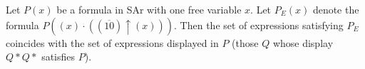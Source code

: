 Let $P(x)$ be a formula in SAr with one free variable $x$. Let $P_E(x)$ denote the formula $P((x) \cdot ((\overline{10}) \uparrow (x)))$. Then the set of expressions satisfying $P_E$ coincides with the set of expressions displayed in $P$ (those $Q$ whose display $Q * Q*$ satisfies $P$).
